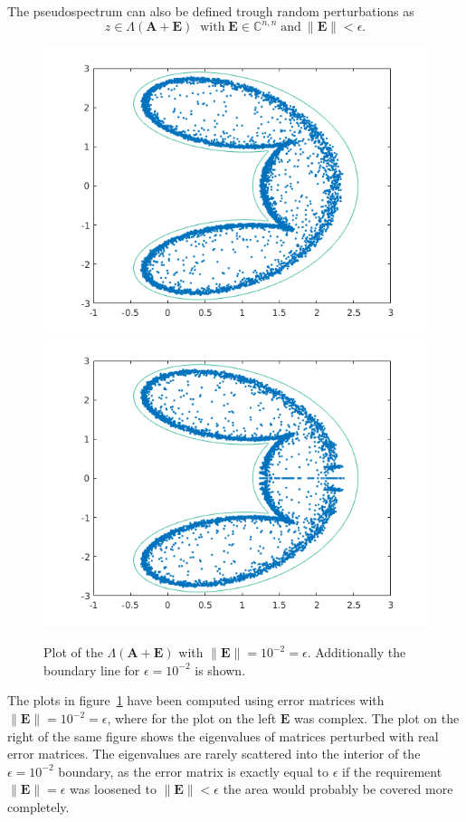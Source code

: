 The pseudospectrum can also be defined trough random perturbations as
\begin{equation}
 z \in \Lambda(\mathbf{A} + \mathbf{E}) \;\; \text{with} \; \mathbf{E} \in \mathbb{C}^{n,n} \; \text{and} \: \|\mathbf{E}\| < \epsilon.
\label{eq:defPert}
\end{equation}
\begin{figure}
\includegraphics[width=0.4\linewidth]{../src/figures/randPert}
\includegraphics[width=0.4\linewidth]{../src/figures/randPertReal}
\caption{Plot of the $\Lambda(\mathbf{A} + \mathbf{E})$ with $\|\mathbf{E}\| = 10^{-2} = \epsilon$. Additionally the boundary line for $\epsilon = 10^{-2}$ is shown. }
\label{fig:randPerts}
\end{figure}
The plots in figure~\ref{fig:randPerts} have been computed using error matrices with $\|\mathbf{E}\| = 10^{-2} = \epsilon$, where for the plot on the left $\mathbf{E}$ was complex. The plot on the right of the same figure shows the eigenvalues of matrices perturbed with real error matrices. The eigenvalues are rarely scattered into the interior of the $ \epsilon = 10^{-2}$ boundary, as the error matrix is exactly equal to $\epsilon$ if the requirement $\| \mathbf{E} \| = \epsilon$ was loosened to $\| \mathbf{E} \| < \epsilon$ the area would probably be covered more completely.

